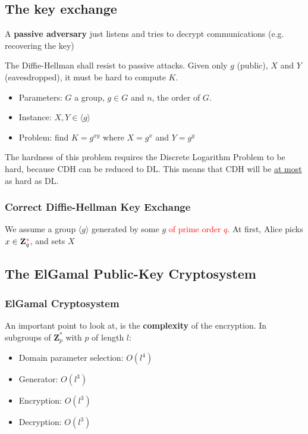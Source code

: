 \documentclass[11pt,a4paper]{article}
\newcommand{\bz}{\ensuremath{\mathbf{Z}}}
\begin{document}
\subsection{The key exchange} %
\label{sub:The key exchange}
\begin{definition}
    A \textbf{passive adversary} just listens and tries to decrypt communications (e.g. recovering the key)
\end{definition}
The Diffie-Hellman shall resist to passive attacks. Given only $g$ (public), $X$ and $Y$ (eavesdropped), it must be hard to compute $K$.

\begin{definition}
    \begin{itemize}
        \item Parameters: $G$ a group, $g \in G$ and $n$, the order of $G$.%
        \item Instance: $X,Y \in \langle g \rangle$
        \item Problem: find $K = g^{xy}$ where $X = g^x$ and $Y = g^y$
    \end{itemize}
\end{definition}
The hardness of this problem requires the Discrete Logarithm Problem to be hard, because CDH can be reduced to DL. This means that CDH will be \uline{at most} as hard as DL.

\subsubsection{Correct Diffie-Hellman Key Exchange} %
\label{ssub:Correct Diffie-Hellman Key Exchange}
We assume a group $\langle g \rangle$ generated by some $g$ \textcolor{red}{of prime order $q$}. At first, Alice picks $x \in \bz_q^{\textcolor{red}{*}}$, and sets $X$

\subsection{The ElGamal Public-Key Cryptosystem} %
\label{sub:The ElGamal Public-Key Cryptosystem}
\subsubsection{ElGamal Cryptosystem} %
\label{ssub:ElGamal Cryptosystem}

An important point to look at, is the \textbf{complexity} of the encryption. In subgroups of $\bz^*_p$ with $p$ of length $l$:
\begin{itemize}
    \item Domain parameter selection: $O(l^4)$
    \item Generator: $O(l^3)$
    \item Encryption: $O(l^3)$
    \item Decryption: $O(l^3)$
\end{itemize}
\end{document}
